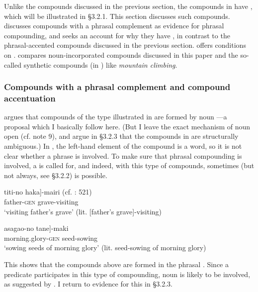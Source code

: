 \documentclass[output=paper]{LSP/langsci}
\begin{document}
Unlike the compounds discussed in the previous section, the compounds in  have , which will be illustrated in §3.2.1. This section discusses such compounds.  discusses compounds with a phrasal complement as evidence for phrasal compounding, and seeks an account for why they have , in contrast to the phrasal-accented compounds discussed in the previous section.  offers conditions on  .  compares noun-incorporated compounds discussed in this paper and the so-called synthetic compounds (in ) like \textit{mountain climbing}.

\subsubsection{Compounds with a phrasal complement and compound accentuation}\label{sec:nishiyama:3.2.1}
\citet[496]{Sugioka2002} argues that compounds of the type illustrated in  are formed by noun —a proposal which I basically follow here. (But I leave the exact mechanism of noun  open (cf. note 9), and argue in §3.2.3 that the compounds in  are structurally ambiguous.) In , the left-hand element of the compound is a word, so it is not clear whether a phrase is involved. To make sure that phrasal compounding is involved, a  is called for, and indeed, with this type of compounds, sometimes (but not always, see §3.2.2)   is possible.

\ea\label{ex:nishiyama:19}
 \ea
 \gll {\ob}titi-no    haka]-mairi    (cf. \citealt{Kageyama2009}: 521)\\
    father-\textsc{gen} grave-visiting\\
\glt ‘visiting father’s grave’ (lit. [father’s grave]-visiting)

  \ex
  \gll {\ob}asagao-no       tane]-maki    \citep[334]{Kageyama1993}\\
    morning.glory-\textsc{gen} seed-sowing    \\
\glt ‘sowing seeds of morning glory’ (lit. seed-sowing of morning glory)
\z
\z

This shows that the compounds above are formed in the phrasal . Since a predicate participates in this type of compounding, noun  is likely to be involved, as suggested by \citet{Sugioka2002}. I return to evidence for this in §3.2.3.
\end{document}
